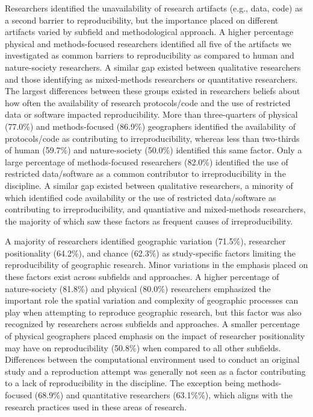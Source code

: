 \documentclass[]{interact}
\theoremstyle{plain}%
\theoremstyle{definition}
\theoremstyle{remark}
\begin{document}
Researchers identified the unavailability of research artifacts (e.g., data, code) as a second barrier to reproducibility, but the importance placed on different artifacts varied by subfield and methodological approach.
A higher percentage physical and methods-focused researchers identified all five of the artifacts we investigated as common barriers to reproducibility as compared to human and nature-society researchers.
A similar gap existed between qualitative researchers and those identifying as mixed-methods researchers or quantitative researchers. 
The largest differences between these groups existed in researchers beliefs about how often the availability of research protocols/code and the use of restricted data or software impacted reproducibility.
More than three-quarters of physical (77.0\%) and methods-focused (86.9\%) geographers identified the availability of protocols/code as contributing to irreproducibility, whereas less than two-thirds of human (59.7\%) and nature-society (50.0\%) identified this same factor. 
Only a large percentage of methods-focused researchers (82.0\%) identified the use of restricted data/software as a common contributor to irreproducibility in the discipline.
A similar gap existed between qualitative researchers, a minority of which identified code availability or the use of restricted data/software as contributing to irreproducibility, and quantiative and mixed-methods researchers, the majority of which saw these factors as frequent causes of irreproducibility.  

A majority of researchers identified geographic variation (71.5\%), researcher positionality (64.2\%), and chance (62.3\%) as study-specific factors limiting the reproducibility of geographic research.
Minor variations in the emphasis placed on these factors exist across subfields and approaches. 
A higher percentage of nature-society (81.8\%) and physical (80.0\%) researchers emphasized the important role the spatial variation and complexity of geographic processes can play when attempting to reproduce geographic research, but this factor was also recognized by researchers across subfields and approaches. 
A smaller percentage of physical geographers placed emphasis on the impact of researcher positionality may have on reproducibility (50.8\%) when compared to all other subfields.  
Differences between the computational environment used to conduct an original study and a reproduction attempt was generally not seen as a factor contributing to a lack of reproducibility in the discipline. 
The exception being methods-focused (68.9\%) and quantitative researchers (63.1\%\%), which aligns with the research practices used in these areas of research.
\end{document}
